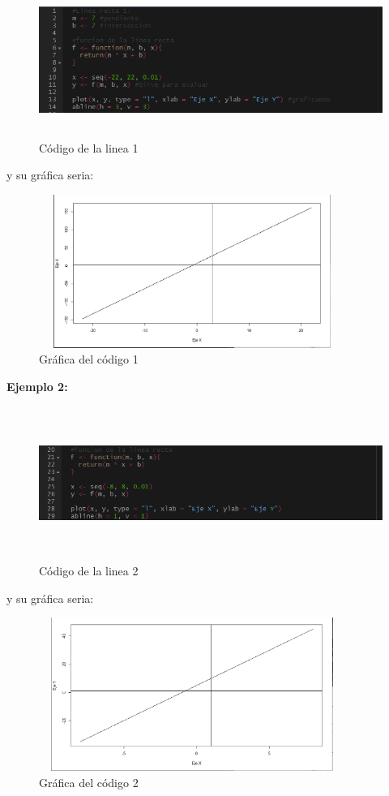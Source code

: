 \documentclass{article}
\begin{document}
\begin{figure}[h]
    \centering
    \includegraphics[width=12cm, height=5cm]{Codigolinea1}
    \caption{Código de la linea 1}
    \label{fig:mesh1}
\end{figure}
y su gráfica seria:
\begin{figure}[h]
    \centering
    \includegraphics[width=10cm, height=5cm]{Grafica1}
    \caption{Gráfica del código 1}
    \label{fig:mesh2}
\end{figure}

\newpage

\textbf{Ejemplo 2:}

\begin{figure}[h]
    \centering
    \includegraphics[width=12cm, height=5cm]{Codigolinea2}
    \caption{Código de la linea 2}
    \label{fig:mesh3}
\end{figure}
y su gráfica seria:
\begin{figure}[h]
    \centering
    \includegraphics[width=10cm, height=5cm]{Grafica2}
    \caption{Gráfica del código 2}
    \label{fig:mesh4}
\end{figure}
\end{document}
